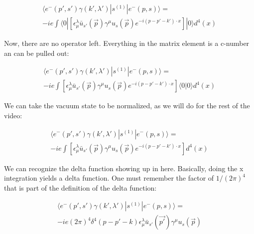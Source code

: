 \documentclass[a4]{article}
\begin{document}
\begin{framed}
        \begin{equation}
            \begin{aligned}
                \langle e^{-} (p', s') \gamma (k', \lambda') | s^{(1)} | e^{-} (p, s) \rangle = \\
                - i e \int \langle 0 | [\epsilon^{\lambda}_{\mu} \bar{u}_{s'} (\vec{p}) \gamma^{\mu} u_{s} (\vec{p}) e^{- i (p - p' - k') \cdot x}] | 0 \rangle d^{4} (x)
            \end{aligned}
        \end{equation}

        Now, there are no operator left. Everything in the matrix element is a c-number an can be pulled out:

        \begin{equation}
            \begin{aligned}
                \langle e^{-} (p', s') \gamma (k', \lambda') | s^{(1)} | e^{-} (p, s) \rangle = \\
                - i e \int [\epsilon^{\lambda}_{\mu} \bar{u}_{s'} (\vec{p}) \gamma^{\mu} u_{s} (\vec{p}) e^{- i (p - p' - k') \cdot x}] \langle 0 | 0 \rangle d^{4} (x)
            \end{aligned}
        \end{equation}

        We can take the vacuum state to be normalized, as we will do for the rest of the video:

        \begin{equation}
            \begin{aligned}
                \langle e^{-} (p', s') \gamma (k', \lambda') | s^{(1)} | e^{-} (p, s) \rangle = \\
                - i e \int [\epsilon^{\lambda}_{\mu} \bar{u}_{s'} (\vec{p}) \gamma^{\mu} u_{s} (\vec{p}) e^{- i (p - p' - k') \cdot x}] d^{4} (x)
            \end{aligned}
        \end{equation}

        We can recognize the delta function showing up in here. Basically, doing the x integration yields a delta function. One must remember the factor of $1/(2 \pi)^{4}$ that
        is part of the definition of the delta function:

        \begin{equation}
            \begin{aligned}
                \langle e^{-} (p', s') \gamma (k', \lambda') | s^{(1)} | e^{-} (p, s) \rangle = \\
                - i e (2 \pi)^{4} \delta^{4} (p - p' - k) \epsilon^{\lambda}_{\mu} \bar{u}_{s'} (\vec{p'}) \gamma^{\mu} u_{s} (\vec{p})
            \end{aligned}
        \end{equation}


\end{framed}
\end{document}
